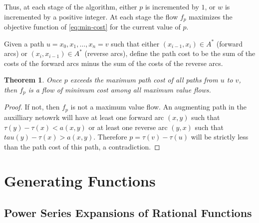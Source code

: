 \documentclass{amsbook}
\newtheorem{theorem}{Theorem}[section]
\theoremstyle{definition}
\theoremstyle{remark}
\begin{document}
Thus, at each stage of the algorithm, either $p$ is incremented by $1$, or $w$ is incremented by a positive integer.
At each stage the flow $f_p$ maximizes the objective function of \eqref{eq:min-cost} for the current value of $p$.

Given a path $u=x_0,x_1,\dotsc,x_n=v$ such that either $(x_{i-1},x_i)\in A^*$ (forward arcs) or $(x_i,x_{i-1})\in A^*$ (reverse arcs), define the path cost to be the sum of the costs of the forward arcs minus the sum of the costs of the reverse arcs.
\begin{theorem}
  Once $p$ exceeds the maximum path cost of all paths from $u$ to $v$, then $f_p$ is a flow of minimum cost among all maximum value flows.
\end{theorem}
\begin{proof}
  If not, then $f_p$ is not a maximum value flow.
  An augmenting path in the auxilliary netowrk will have at least one forward arc $(x,y)$ such that $\tau(y)-\tau(x)<a(x,y)$ or at least one reverse arc $(y,x)$ such that $tau(y)-\tau(x)>a(x,y)$.
  Therefore $p=\tau(v)-\tau(u)$ will be strictly less than the path cost of this path, a contradiction.
\end{proof}

\chapter{Generating Functions}
\label{cha:gen-fns}

\section{Power Series Expansions of Rational Functions}
\label{sec:power-seri-expans}
\end{document}
